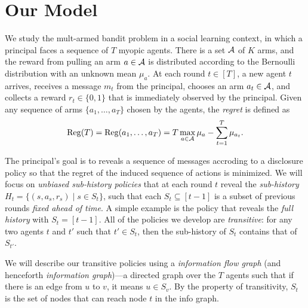 \section{Our Model}
\label{sec:model}

We study the mult-armed bandit problem in a social learning context,
in which a principal faces a sequence of $T$ myopic agents. There is a
set $\mathcal{A}$ of $K$ arms, and the reward from pulling an arm $a\in \mathcal{A}$ is
distributed according to the Bernoulli distribution with an unknown
mean $\mu_a$.%
At each round $t\in [T]$, a new agent $t$ arrives, receives a message
$m_t$ from the principal, chooses an arm $a_t\in \mathcal{A}$, and collects a
reward $r_t\in \{0,1\}$ that is immediately observed by the
principal. Given any sequence of arms $\{a_1, \ldots, a_T\}$ chosen by
the agents, the \emph{regret} is defined as
\[
  \mathrm{Reg}(T)= \mathrm{Reg}(a_1, \ldots , a_T) = T \max_{a\in \mathcal{A}} \mu_a -
  \sum_{t=1}^T \mu_{a_t}.
\]





 The principal's goal is to reveals
a sequence of messages accroding to a disclosure policy so that the
regret of the induced sequence of actions is minimized. We will focus
on \emph{unbiased sub-history policies} that at each round $t$ reveal
the \emph{sub-history} $H_t = \{(s, a_s, r_s)\mid s \in S_t\}$, such
that each $S_t\subseteq [t-1]$ is a subset of previous rounds
\emph{fixed ahead of time}. A simple example is the policy that
reveals the \emph{full history} with $S_t = [t-1]$.  All of the
policies we develop are \emph{transitive}: for any two agents $t$ and
$t'$ such that $t'\in S_t$, then the sub-history of $S_t$ contains
that of $S_{t'}$.


 We will describe our transitive
policies using a \emph{information flow graph} (and henceforth
\emph{information graph})---a directed graph over the $T$ agents such that if
there is an edge from $u$ to $v$, it means $u\in S_v$. By the property
of transitivity, $S_t$ is the set of nodes that can reach node $t$ in
the info graph.

